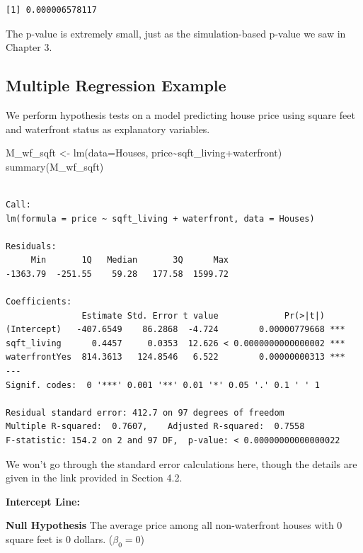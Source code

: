 \documentclass[
  letterpaper,
  DIV=11,
  numbers=noendperiod]{scrreprt}
\newenvironment{Shaded}{\begin{snugshade}}{\end{snugshade}}
\newcommand{\AttributeTok}[1]{\textcolor[rgb]{0.40,0.45,0.13}{#1}}
\newcommand{\FunctionTok}[1]{\textcolor[rgb]{0.28,0.35,0.67}{#1}}
\newcommand{\NormalTok}[1]{\textcolor[rgb]{0.00,0.23,0.31}{#1}}
\newcommand{\OtherTok}[1]{\textcolor[rgb]{0.00,0.23,0.31}{#1}}
\newcommand{\SpecialCharTok}[1]{\textcolor[rgb]{0.37,0.37,0.37}{#1}}
\begin{document}
\begin{verbatim}
[1] 0.000006578117
\end{verbatim}

The p-value is extremely small, just as the simulation-based p-value we
saw in Chapter 3.

\subsection{Multiple Regression
Example}\label{multiple-regression-example}

We perform hypothesis tests on a model predicting house price using
square feet and waterfront status as explanatory variables.

\begin{Shaded}
\begin{Highlighting}[]
\NormalTok{M\_wf\_sqft }\OtherTok{\textless{}{-}} \FunctionTok{lm}\NormalTok{(}\AttributeTok{data=}\NormalTok{Houses, price}\SpecialCharTok{\textasciitilde{}}\NormalTok{sqft\_living}\SpecialCharTok{+}\NormalTok{waterfront)}
\FunctionTok{summary}\NormalTok{(M\_wf\_sqft)}
\end{Highlighting}
\end{Shaded}

\begin{verbatim}

Call:
lm(formula = price ~ sqft_living + waterfront, data = Houses)

Residuals:
     Min       1Q   Median       3Q      Max 
-1363.79  -251.55    59.28   177.58  1599.72 

Coefficients:
               Estimate Std. Error t value             Pr(>|t|)    
(Intercept)   -407.6549    86.2868  -4.724        0.00000779668 ***
sqft_living      0.4457     0.0353  12.626 < 0.0000000000000002 ***
waterfrontYes  814.3613   124.8546   6.522        0.00000000313 ***
---
Signif. codes:  0 '***' 0.001 '**' 0.01 '*' 0.05 '.' 0.1 ' ' 1

Residual standard error: 412.7 on 97 degrees of freedom
Multiple R-squared:  0.7607,    Adjusted R-squared:  0.7558 
F-statistic: 154.2 on 2 and 97 DF,  p-value: < 0.00000000000000022
\end{verbatim}

We won't go through the standard error calculations here, though the
details are given in the link provided in Section 4.2.

\textbf{Intercept Line:}

\textbf{Null Hypothesis} The average price among all non-waterfront
houses with 0 square feet is 0 dollars. (\(\beta_0=0\))
\end{document}

